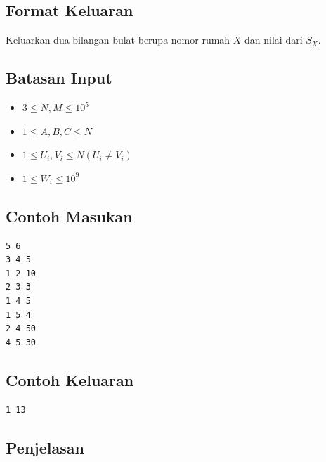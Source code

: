 \documentclass{article}
\begin{document}
\subsection*{Format Keluaran}
Keluarkan dua bilangan bulat berupa nomor rumah $X$ dan nilai dari $S_X$.

\subsection*{Batasan Input}

\begin{itemize}
    \item{$3 \leq N, M \leq 10^5$}
    \item{$1 \leq A, B, C \leq N$}
    \item{$1 \leq U_i, V_i \leq N (U_i \neq V_i)$}
    \item{$1 \leq W_i \leq 10^9$}
\end{itemize}

\begin{multicols}{2}
\subsection*{Contoh Masukan}
\begin{lstlisting}
5 6
3 4 5
1 2 10
2 3 3
1 4 5
1 5 4
2 4 50
4 5 30

\end{lstlisting}
\columnbreak
\subsection*{Contoh Keluaran}
\begin{lstlisting}
1 13
\end{lstlisting}
\vfill
\null
\end{multicols}

\subsection*{Penjelasan}
\end{document}
